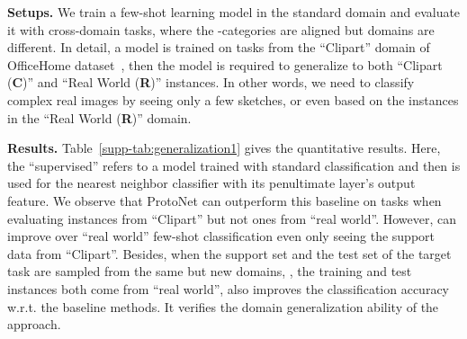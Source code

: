 \par\noindent\textbf{Setups.} We train a few-shot learning model in the standard domain and evaluate it with cross-domain tasks, where the -categories are aligned but domains are different. In detail, a model is trained on tasks from the ``Clipart'' domain of OfficeHome dataset~\cite{Venkateswara2017Office}, then the model is required to generalize to both ``Clipart (\textbf{C})'' and ``Real World (\textbf{R})'' instances. In other words, we need to classify complex real images by seeing only a few sketches, or even based on the instances in the ``Real World (\textbf{R})'' domain. 

\par\noindent\textbf{Results.} Table~\ref{supp-tab:generalization1} gives the quantitative results. Here, the ``supervised'' refers to a model trained with standard classification and then is used for the nearest neighbor classifier with its penultimate layer's output feature. We observe that {ProtoNet} can outperform this baseline on tasks when evaluating instances from ``Clipart'' but not ones from ``real world''. However, \feat can improve over ``real world'' few-shot classification even only seeing the support data from ``Clipart''. Besides, when the support set and the test set of the target task are sampled from the same but new domains, \eg, the training and test instances both come from ``real world'', {\feat} also improves the classification accuracy w.r.t. the baseline methods. It verifies the domain generalization ability of the {\feat} approach. 

